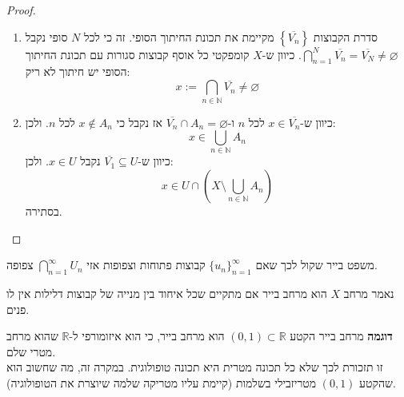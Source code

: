 \documentclass{tstextbook}
\begin{document}
\begin{proof}
\begin{enumerate}
    \item סדרת הקבוצות \(\left\{  \overline{V_{n}}  \right\}\) מקיימת את תכונת החיתוך הסופי. זה כי לכל \(N\) סופי נקבל \(\bigcap_{n=1}^{N}{\overline{{V_{n}}}}={\overline{{V_{N}}}}\ne\varnothing\). כיוון ש-\(X\) קומפקטי כל אוסף קבוצות סגורות עם תכונת החיתוך הסופי יש חיתוך לא ריק: 
$$x:=\bigcap_{n\in\mathbb{N}}{\overline{{V_{n}}}}\neq\varnothing$$


    \item כיוון ש-\(x \in \overline{V_{n}}\) לכל \(n\) ו-\(\overline{V_{n}}\cap A_{n}=\varnothing\) אז נקבל כי \(x \not \in A_{n}\) לכל \(n\). ולכן: 
$$x\in\bigcup_{n\in\mathbb{N}}A_{n}$$
כיוון ש-\(\overline{V_{1}}\subseteq U\) נקבל \(x \in U\). ולכן:
$$x\in U\cap\left(X\setminus\bigcup_{n\in\mathbb{N}}A_{n}\right)$$
בסתירה.


  \end{enumerate}
\end{proof}
\begin{lemma}
משפט בייר שקול לכך שאם \(\{ u_{n} \}_{n=1}^{\infty}\) קבוצות פתוחות וצפופות אזי \(\bigcap_{n=1}^{\infty} U_{n}\) צפופה.

\end{lemma}
\begin{definition}
נאמר מרחב \(X\) הוא מרחב בייר אם מתקיים שכל איחוד בין מנייה של קבוצות דלילות אין לו פנים.

\end{definition}
\textbf{דוגמה} מרחב בייר
הקטע \((0,1)\subset\mathbb{R}\) הוא מרחב בייר, כי הוא איזומורפי ל-\(\mathbb{R}\) שהוא מרחב מטרי שלם.\\

זו תזכורת לכך שלא כל תכונה מטרית היא תכונה טופולוגית. 
במקרה זה, מה שחשוב הוא שהקטע \((0,1)\) מטריזבילי בשלמות (קיימת עליו מטריקה שלמה שיוצרת את הטופולוגיה).
\end{document}
